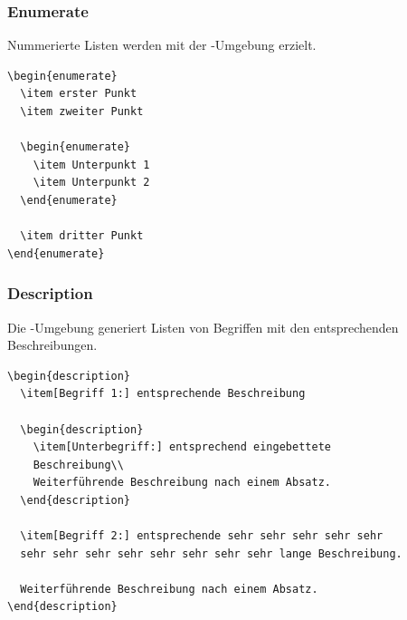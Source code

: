 \begin{frame}[fragile]
\frametitle{Enumerate}

Nummerierte Listen werden mit der -Umgebung erzielt.

\begin{multicols}{2}

\begin{lstlisting}
\begin{enumerate}
  \item erster Punkt
  \item zweiter Punkt

  \begin{enumerate}
    \item Unterpunkt 1
    \item Unterpunkt 2
  \end{enumerate}
  
  \item dritter Punkt
\end{enumerate}
\end{lstlisting}
\columnbreak{}
\end{multicols}

\end{frame}

\begin{frame}[fragile]
\frametitle{Description}

Die -Umgebung generiert Listen von Begriffen mit den entsprechenden Beschreibungen.

\begin{lstlisting}
\begin{description}
  \item[Begriff 1:] entsprechende Beschreibung

  \begin{description}
    \item[Unterbegriff:] entsprechend eingebettete 
    Beschreibung\\
    Weiterführende Beschreibung nach einem Absatz.
  \end{description}

  \item[Begriff 2:] entsprechende sehr sehr sehr sehr sehr 
  sehr sehr sehr sehr sehr sehr sehr sehr lange Beschreibung.
    
  Weiterführende Beschreibung nach einem Absatz.
\end{description}
\end{lstlisting}

\end{frame}


